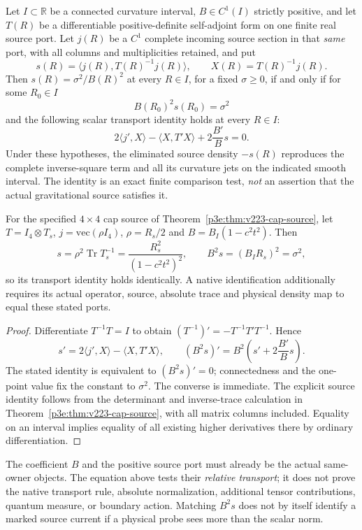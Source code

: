 \documentclass[12pt,a4paper]{article}
\begin{document}
\begin{proposition}
\label{p3e:prop:v289-cap-source-ward}
Let $I\subset\mathbb R$ be a connected curvature interval, $B\in C^1(I)$
strictly positive, and let $T(R)$ be a differentiable positive-definite
self-adjoint form on one finite real source port. Let $j(R)$ be a $C^1$
complete incoming source section in that \emph{same} port, with all columns
and multiplicities retained, and put
\[
 s(R)=\langle j(R),T(R)^{-1}j(R)\rangle,\qquad
 X(R)=T(R)^{-1}j(R).
\]
Then $s(R)=\sigma^2/B(R)^2$ at every $R\in I$, for a fixed
$\sigma\ge0$, if and only if for some $R_0\in I$
\[
 B(R_0)^2s(R_0)=\sigma^2
\]
and the following scalar transport identity holds at every $R\in I$:
\begin{equation}
\label{p3e:eq:v289-source-ward}
 \boxed{2\langle j',X\rangle-\langle X,T'X\rangle
          +2\frac{B'}{B}s=0.}
\end{equation}
Under these hypotheses, the eliminated source density $-s(R)$
reproduces the complete inverse-square term and all its curvature jets
on the indicated smooth interval. The identity is an exact finite
comparison test, \emph{not} an assertion that the actual gravitational
source satisfies it.

For the specified $4\times4$ cap source of
Theorem~\ref{p3e:thm:v223-cap-source}, let
$T=I_4\otimes T_s$, $j=\mathrm{vec}(\rho I_4)$,
$\rho=R_s/2$ and $B=B_I(1-c^2t^2)$. Then
\[
 s=\rho^2\operatorname{Tr}T_s^{-1}
  =\frac{R_s^2}{(1-c^2t^2)^2},\qquad
 B^2s=(B_IR_s)^2=\sigma^2,
\]
so its transport identity holds identically. A native identification
additionally requires its actual operator, source, absolute trace and
physical density map to equal these stated ports.
\end{proposition}
\begin{proof}
Differentiate $T^{-1}T=I$ to obtain
$(T^{-1})'=-T^{-1}T'T^{-1}$. Hence
\[
 s'=2\langle j',X\rangle-\langle X,T'X\rangle,
 \qquad (B^2s)'=B^2\left(s'+2\frac{B'}B s\right).
\]
The stated identity is equivalent to $(B^2s)'=0$; connectedness
and the one-point value fix the constant to $\sigma^2$. The converse
is immediate. The explicit source identity follows from the determinant
and inverse-trace calculation in
Theorem~\ref{p3e:thm:v223-cap-source}, with all matrix
columns included. Equality on an interval implies equality of all
existing higher derivatives there by ordinary differentiation.
\end{proof}
\begin{remark}
The coefficient $B$ and the positive source port must already be the
actual same-owner objects. The equation above tests their \emph{relative
transport}; it does not prove the native transport rule, absolute
normalization, additional tensor contributions, quantum measure, or
boundary action. Matching $B^2s$ does not by itself identify a marked
source current if a physical probe sees more than the scalar norm.
\end{remark}
\end{document}
